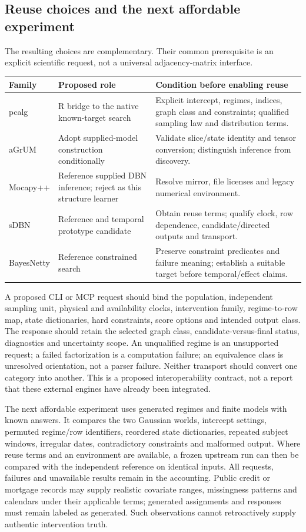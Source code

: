 \subsection{Reuse choices and the next affordable experiment}

The resulting choices are complementary. Their common prerequisite is an
explicit scientific request, not a universal adjacency-matrix interface.

\begin{longtable}{p{}p{}p{}}
\toprule
Family & Proposed role & Condition before enabling reuse\\
\midrule
\endhead
pcalg & R bridge to the native known-target search & Explicit intercept, regimes,
indices, graph class and constraints; qualified sampling law and distribution terms.\\
aGrUM & Adopt supplied-model construction conditionally & Validate slice/state
identity and tensor conversion; distinguish inference from discovery.\\
Mocapy++ & Reference supplied DBN inference; reject as this structure learner &
Resolve mirror, file licenses and legacy numerical environment.\\
sDBN & Reference and temporal prototype candidate & Obtain reuse terms; qualify
clock, row dependence, candidate/directed outputs and transport.\\
BayesNetty & Reference constrained search & Preserve constraint predicates and
failure meaning; establish a suitable target before temporal/effect claims.\\
\bottomrule
\end{longtable}

A proposed CLI or MCP request should bind the population, independent sampling
unit, physical and availability clocks, intervention family, regime-to-row map,
state dictionaries, hard constraints, score options and intended output class.
The response should retain the selected graph class, candidate-versus-final
status, diagnostics and uncertainty scope. An unqualified regime is an
unsupported request; a failed factorization is a computation failure; an
equivalence class is unresolved orientation, not a parser failure. Neither
transport should convert one category into another. This is a proposed
interoperability contract, not a report that these external engines have
already been integrated.\citep{exec16_ct_design}

The next affordable experiment uses generated regimes and finite models with
known answers. It compares the two Gaussian worlds, intercept settings,
permuted regime/row identifiers, reordered state dictionaries, repeated subject
windows, irregular dates, contradictory constraints and malformed output.
Where reuse terms and an environment are available, a frozen upstream run can
then be compared with the independent reference on identical inputs. All
requests, failures and unavailable results remain in the accounting. Public
credit or mortgage records may supply realistic covariate ranges, missingness
patterns and calendars under their applicable terms; generated assignments
and responses must remain labeled as generated. Such observations cannot
retroactively supply authentic intervention truth.

